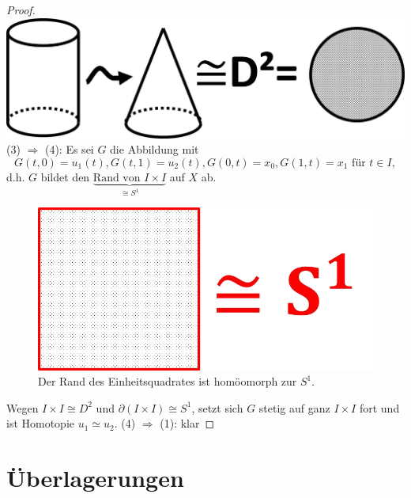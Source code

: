 \documentclass[a4paper,11pt,notitlepage]{report}
\theoremstyle{definition}
\begin{document}
\begin{proof}
	\includegraphics[scale=0.4]{images/Zylinder_nach_D2.png}
	\newline
	(3) $\Rightarrow$ (4): Es sei $G$ die Abbildung mit 
	$$G(t,0) = u_1(t), G(t,1)=u_2(t), G(0,t) = x_0, G(1,t)=x_1 \text{ für } t \in I,$$
	d.h. $G$ bildet den $\underbrace{\text{Rand von }I \times I}_{\cong S^1}$ auf $X$ ab.
	\begin{figure}[h]
		\centering
		\includegraphics[scale=0.4]{images/Rand_I2_S1.png}
		\caption{Der Rand des Einheitsquadrates ist homöomorph zur $S^1$.}
	\end{figure}	
	\newline
	Wegen $I \times I \cong D^2$ und $\partial(I \times I) \cong S^1$, setzt sich $G$ stetig auf ganz $I \times I$ fort und ist Homotopie $u_1 \simeq u_2$.
	\newline
	(4) $\Rightarrow$ (1): klar
\end{proof}

\newpage

\section{Überlagerungen}
\end{document}
